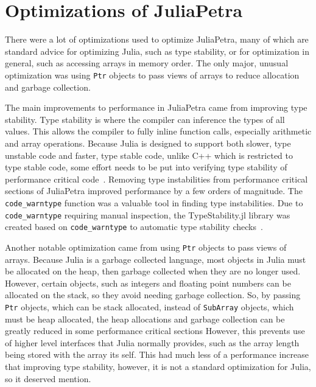 \documentclass[acmsmall]{acmart}
\newcommand{\snippet}[1]{\lstinline[mathescape]{#1}}
\begin{document}
	\section{Optimizations of JuliaPetra}
	
	There were a lot of optimizations used to optimize JuliaPetra, many of which are standard advice for optimizing Julia, such as type stability, or for optimization in general, such as accessing arrays in memory order.
	The only major, unusual optimization was using \snippet{Ptr} objects to pass views of arrays to reduce allocation and garbage collection.
	
	The main improvements to performance in JuliaPetra came from improving type stability.
	Type stability is where the compiler can inference the types of all values.
	This allows the compiler to fully inline function calls, especially arithmetic and array operations.
	Because Julia is designed to support both slower, type unstable code and faster, type stable code,
	unlike C++ which is restricted to type stable code, some effort needs to be put into verifying
	type stability of performance critical code~\cite{Bezanson:2017:FreshApproach}.
	Removing type instabilities from performance critical sections of JuliaPetra improved performance
	by a few orders of magnitude.
	The \snippet{code_warntype} function was a valuable tool in finding type instabilities.
	Due to \snippet{code_warntype} requiring manual inspection, the TypeStability.jl library was created
	based on \snippet{code_warntype} to automatic type stability checks~\cite{Github:TypeStability.jl}.
	
	Another notable optimization came from using \snippet{Ptr} objects to pass views of arrays.
	Because Julia is a garbage collected language, most objects in Julia must be allocated on the heap,
	then garbage collected when they are no longer used.
	However, certain objects, such as integers and floating point numbers can be allocated on the stack,
	so they avoid needing garbage collection.
	So, by passing \snippet{Ptr} objects, which can be stack allocated,
	instead of \snippet{SubArray} objects, which must be heap allocated,
	the heap allocations and garbage collection can be greatly reduced in some performance critical sections
	However, this prevents use of higher level interfaces that Julia normally provides,
	such as the array length being stored with the array its self.
	This had much less of a performance increase that improving type stability,
	however, it is not a standard optimization for Julia, so it deserved mention.
	
\end{document}
